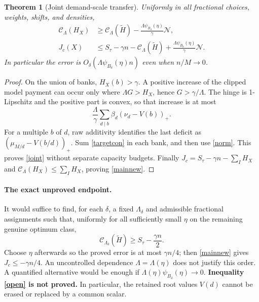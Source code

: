 \documentclass[11pt,a4paper]{article}
\newtheorem{theorem}{Theorem}[section]
\newcommand{\pos}[1]{\left(#1\right)_+}
\begin{document}
\begin{theorem}[Joint demand-scale transfer]
Uniformly in all fractional choices, weights, shifts, and densities,
\begin{align}
 \mathcal C_\Lambda(H_X)&\ge\mathcal C_\Lambda(\widetilde H)
       -\frac{\Lambda\psi_{B_\delta}(\eta)}\gamma\mathcal N,
       \label{joint}\\
 J_c(X)&\le S_\tau-\gamma n
       -\mathcal C_\Lambda(\widetilde H)
       +\frac{\Lambda\psi_{B_\delta}(\eta)}\gamma\mathcal N.
       \label{mainnew}
\end{align}
In particular the error is $O_\delta(\Lambda\psi_{B_\delta}(\eta)n)$ even
when $n/M\to0$.
\end{theorem}
\begin{proof}
On the union of banks, $H_X(b)>\gamma$. A positive increase of the clipped
model payment can occur only where $\Lambda G>H_X$, hence $G>\gamma/\Lambda$.
The hinge is 1-Lipschitz and the positive part is convex, so that increase
is at most
\[
 \frac\Lambda\gamma\sum_{d\mid b}\beta_d(\nu_d-V(b))_+.
\]
For a multiple $b$ of $d$, raw additivity identifies the last deficit as
$\pos{\mu_{M/d}-V(b/d)}$. Sum \eqref{targetcon} in each bank, and then use
\eqref{norm}. This proves \eqref{joint} without separate capacity budgets.
Finally $J_c=S_\tau-\gamma n-\sum_IH_X$ and
$\mathcal C_\Lambda(H_X)\le\sum_IH_X$, proving \eqref{mainnew}.
\end{proof}

\paragraph{The exact unproved endpoint.}
It would suffice to find, for each $\delta$, a fixed $\Lambda_\delta$ and
admissible fractional assignments such that, uniformly for all sufficiently
small $\eta$ on the remaining genuine optimum class,
\begin{equation}
 \boxed{\qquad
 \mathcal C_{\Lambda_\delta}(\widetilde H)
 \ge S_\tau-\frac{\gamma n}{2}.
 \qquad}                                                  \label{open}
\end{equation}
Choose $\eta$ afterwards so the proved error is at most $\gamma n/4$;
then \eqref{mainnew} gives $J_c\le-\gamma n/4$.
An uncontrolled dependence $\Lambda=\Lambda(\eta)$ does not justify this
order. A quantified alternative would be enough if
$\Lambda(\eta)\psi_{B_\delta}(\eta)\to0$.
\textbf{Inequality \eqref{open} is not proved.} In particular, the retained
root values $V(d)$ cannot be erased or replaced by a common scalar.
\end{document}
